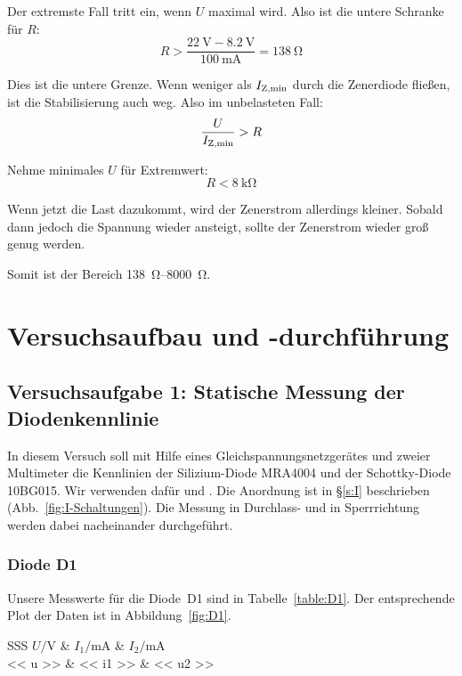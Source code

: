 Der extremste Fall tritt ein, wenn $U$ maximal wird. Also ist die untere
Schranke für $R$:
\[
	R > \frac{\SI{22}\volt - \SI{8.2}\volt}{\SI{100}{\milli\ampere}}
	= \SI{138}\ohm
\]

Dies ist die untere Grenze. Wenn weniger als $I_\text{Z,min}$ durch die Zenerdiode
fließen, ist die Stabilisierung auch weg. Also im unbelasteten Fall:
\[
	\frac U{I_\text{Z,min}} > R
\]

Nehme minimales $U$ für Extremwert:
\[
	R < \SI{8}{\kilo\ohm}
\]

Wenn jetzt die Last dazukommt, wird der Zenerstrom allerdings kleiner. Sobald
dann jedoch die Spannung wieder ansteigt, sollte der Zenerstrom wieder groß
genug werden.

Somit ist der Bereich \SIrange{138}{8000}{\ohm}.


\FloatBarrier
\section{Versuchsaufbau und -durchführung}

\FloatBarrier
\subsection{Versuchsaufgabe 1: Statische Messung der Diodenkennlinie}

In diesem Versuch soll mit Hilfe eines Gleichspannungsnetzgerätes und zweier
Multimeter die Kennlinien der Silizium-Diode MRA4004 und der Schottky-Diode
10BG015. Wir verwenden dafür \fehlt und \fehlt. Die Anordnung ist in §\ref{s:I}
beschrieben (Abb.~\ref{fig:I-Schaltungen}). Die Messung in Durchlass- und in
Sperrrichtung werden dabei nacheinander durchgeführt.

\FloatBarrier
\subsubsection{Diode D1}

Unsere Messwerte für die Diode~D1 sind in Tabelle~\ref{table:D1}. Der
entsprechende Plot der Daten ist in Abbildung~\ref{fig:D1}.

\begin{table}[htbp]
	\centering
	\caption{%
		Messdaten zur Diode D1
	}
	\label{table:D1}
	\begin{tabular}{SSS}
		{$U / \si\volt$} & {$I_1 / \si{\milli\ampere}$} & {$I_2 / \si{\milli\ampere}$} \\
		\hline
		<< u >> & << i1 >> & << u2 >> \\
	\end{tabular}
\end{table}

